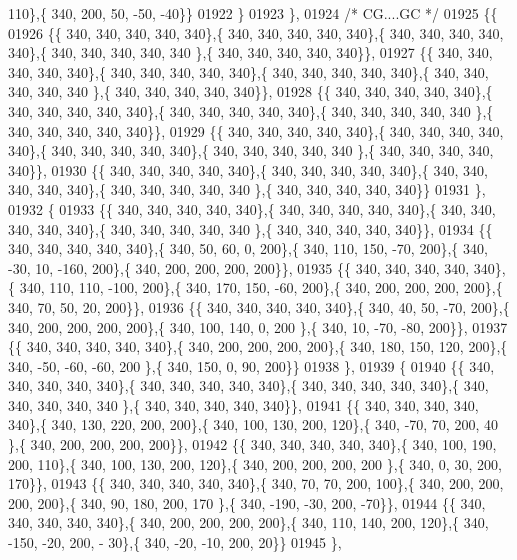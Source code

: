 \begin{DoxyCode}
      110\},\{ 340, 200,  50, -50, -40\}\}
01922 \}
01923 \},
01924 \textcolor{comment}{/* CG....GC */}
01925 \{\{
01926 \{\{ 340, 340, 340, 340, 340\},\{ 340, 340, 340, 340, 340\},\{ 340, 340, 340, 340, 340\},\{ 340, 340, 340, 340, 340
      \},\{ 340, 340, 340, 340, 340\}\},
01927 \{\{ 340, 340, 340, 340, 340\},\{ 340, 340, 340, 340, 340\},\{ 340, 340, 340, 340, 340\},\{ 340, 340, 340, 340, 340
      \},\{ 340, 340, 340, 340, 340\}\},
01928 \{\{ 340, 340, 340, 340, 340\},\{ 340, 340, 340, 340, 340\},\{ 340, 340, 340, 340, 340\},\{ 340, 340, 340, 340, 340
      \},\{ 340, 340, 340, 340, 340\}\},
01929 \{\{ 340, 340, 340, 340, 340\},\{ 340, 340, 340, 340, 340\},\{ 340, 340, 340, 340, 340\},\{ 340, 340, 340, 340, 340
      \},\{ 340, 340, 340, 340, 340\}\},
01930 \{\{ 340, 340, 340, 340, 340\},\{ 340, 340, 340, 340, 340\},\{ 340, 340, 340, 340, 340\},\{ 340, 340, 340, 340, 340
      \},\{ 340, 340, 340, 340, 340\}\}
01931 \},
01932 \{
01933 \{\{ 340, 340, 340, 340, 340\},\{ 340, 340, 340, 340, 340\},\{ 340, 340, 340, 340, 340\},\{ 340, 340, 340, 340, 340
      \},\{ 340, 340, 340, 340, 340\}\},
01934 \{\{ 340, 340, 340, 340, 340\},\{ 340,  50,  60,   0, 200\},\{ 340, 110, 150, -70, 200\},\{ 340, -30,  10, -160, 
      200\},\{ 340, 200, 200, 200, 200\}\},
01935 \{\{ 340, 340, 340, 340, 340\},\{ 340, 110, 110, -100, 200\},\{ 340, 170, 150, -60, 200\},\{ 340, 200, 200, 200, 
      200\},\{ 340,  70,  50,  20, 200\}\},
01936 \{\{ 340, 340, 340, 340, 340\},\{ 340,  40,  50, -70, 200\},\{ 340, 200, 200, 200, 200\},\{ 340, 100, 140,   0, 200
      \},\{ 340,  10, -70, -80, 200\}\},
01937 \{\{ 340, 340, 340, 340, 340\},\{ 340, 200, 200, 200, 200\},\{ 340, 180, 150, 120, 200\},\{ 340, -50, -60, -60, 200
      \},\{ 340, 150,   0,  90, 200\}\}
01938 \},
01939 \{
01940 \{\{ 340, 340, 340, 340, 340\},\{ 340, 340, 340, 340, 340\},\{ 340, 340, 340, 340, 340\},\{ 340, 340, 340, 340, 340
      \},\{ 340, 340, 340, 340, 340\}\},
01941 \{\{ 340, 340, 340, 340, 340\},\{ 340, 130, 220, 200, 200\},\{ 340, 100, 130, 200, 120\},\{ 340, -70,  70, 200,  40
      \},\{ 340, 200, 200, 200, 200\}\},
01942 \{\{ 340, 340, 340, 340, 340\},\{ 340, 100, 190, 200, 110\},\{ 340, 100, 130, 200, 120\},\{ 340, 200, 200, 200, 200
      \},\{ 340,   0,  30, 200, 170\}\},
01943 \{\{ 340, 340, 340, 340, 340\},\{ 340,  70,  70, 200, 100\},\{ 340, 200, 200, 200, 200\},\{ 340,  90, 180, 200, 170
      \},\{ 340, -190, -30, 200, -70\}\},
01944 \{\{ 340, 340, 340, 340, 340\},\{ 340, 200, 200, 200, 200\},\{ 340, 110, 140, 200, 120\},\{ 340, -150, -20, 200, -
      30\},\{ 340, -20, -10, 200,  20\}\}
01945 \},

\end{DoxyCode}
